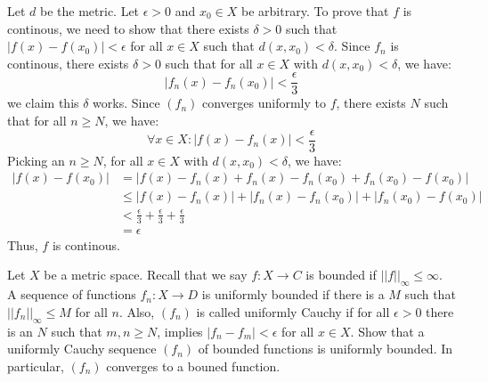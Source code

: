 \documentclass[12pt]{article}
\begin{document}
\begin{solu}
    Let $d$ be the metric. Let $\epsilon > 0$ and $x_0 \in X$ be arbitrary. To prove that $f$ is continous, we need to show that there exists $\delta > 0$ such that $|f(x) - f(x_0)| < \epsilon$ for all $x \in X$ such that $d(x,x_0) < \delta$. \bbni
    Since $f_n$ is continous, there exists $\delta > 0$ such that for all $x \in X$ with $d(x, x_0) < \delta$, we have:
    \[ |f_n(x) - f_n(x_0)| < \frac{\epsilon}{3} \]
    we claim this $\delta$ works. 
    Since $(f_n)$ converges uniformly to $f$, there exists $N$ such that for all $n \geq N$, we have:
    \[ \forall x \in X: |f(x) - f_n(x)| < \frac{\epsilon}{3} \]
    Picking an $n \geq N$, for all $x \in X$ with $d(x, x_0) < \delta$, we have:
    \begin{align*}
        |f(x) -f(x_0)| &= |f(x) - f_n(x) + f_n(x) - f_n(x_0) + f_n(x_0) - f(x_0)| \\
        &\leq |f(x)-f_n(x)| + |f_n(x) -f_n(x_0)| + |f_n(x_0) - f(x_0)| \\
        &< \frac{\epsilon}{3} + \frac{\epsilon}{3} + \frac{\epsilon}{3} \\
        &= \epsilon
    \end{align*}
    Thus, $f$ is continous. 
\end{solu}
\newpage

\begin{problab}{7}
    Let $X$ be a metric space. Recall that we say $f: X \to C$ is bounded if $||f||_\infty \leq \infty$. A sequence of functions $f_n: X \to D$ is uniformly bounded if there is a $M$ such that $||f_n||_\infty \leq M$ for all $n$. Also, $(f_n)$ is called uniformly Cauchy if for all $\epsilon > 0$ there is an $N$ such that $m, n \geq N$, implies $|f_n - f_m| < \epsilon$ for all $x \in X$. Show that a uniformly Cauchy sequence $(f_n)$ of bounded functions is uniformly bounded. In particular, $(f_n)$ converges to a bouned function.
\end{problab}
\end{document}

